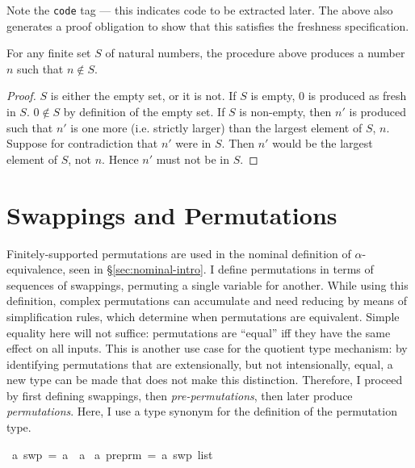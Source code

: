 Note the \texttt{code} tag --- this indicates code to be extracted later.
The above also generates a proof obligation to show that this satisfies the freshness specification.

\begin{lemma}
For any finite set \(S\) of natural numbers, the procedure above produces a number \(n\) such that \(n \notin S\).
\end{lemma}
\begin{proof}
\(S\) is either the empty set, or it is not.
If \(S\) is empty, 0 is produced as fresh in \(S\).
\(0 \notin S\) by definition of the empty set.
If \(S\) is non-empty, then \(n'\) is produced such that \(n'\) is one more (i.e. strictly larger) than the largest element of \(S\), \(n\).
Suppose for contradiction that \(n'\) were in \(S\).
Then \(n'\) would be the largest element of \(S\), not \(n\).
Hence \(n'\) must not be in \(S\).
\end{proof}

\section{Swappings and Permutations}
\label{sec:permutations}
Finitely-supported permutations are used in the nominal definition of \(\alpha\)-equivalence, seen in \S\ref{sec:nominal-intro}.
I define permutations in terms of sequences of swappings, permuting a single variable for another.
While using this definition, complex permutations can accumulate and need reducing by means of simplification rules, which determine when permutations are equivalent.
Simple equality here will not suffice: permutations are ``equal'' iff they have the same effect on all inputs.
This is another use case for the quotient type mechanism: by identifying permutations that are extensionally, but not intensionally, equal, a new type can be made that does not make this distinction.
Therefore, I proceed by first defining swappings, then \emph{pre-permutations}, then later produce \emph{permutations}.
Here, I use a type synonym for the definition of the permutation type.

\begin{implementation}
\isamarkupfalse%
\ {\isacharprime}a\ swp\ =\ {\isachardoublequoteopen}{\isacharprime}a\ {\isasymtimes}\ {\isacharprime}a{\isachardoublequoteclose}\isanewline
{}\isamarkupfalse%
\ {\isacharprime}a\ preprm\ =\ {\isachardoublequoteopen}{\isacharprime}a\ swp\ list{\isachardoublequoteclose}\isanewline
\end{implementation}

